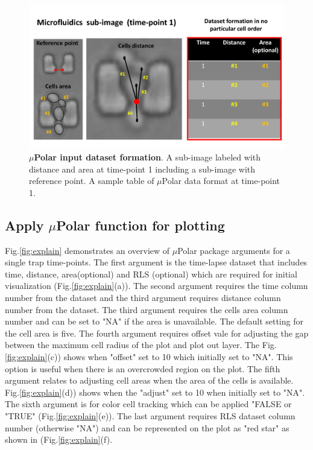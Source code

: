\documentclass[conference]{IEEEtran}
\begin{document}
\begin{figure}
\centering
\includegraphics[width=\textwidth,height=10 cm]{Patterns/table.pdf}
\caption{ \textbf{ $\mu$Polar input dataset formation}. A sub-image labeled with distance and area at time-point 1 including a sub-image with reference point. A sample table of $\mu$Polar data format at time-point 1.}
\label{fig:table}
\end{figure}



\subsection{Apply $\mu$Polar function for plotting}

Fig.\ref{fig:explain} demonstrates an overview of $\mu$Polar package arguments for a single trap time-points. The first argument is the time-lapse dataset that includes time, distance, area(optional) and RLS (optional) which are required for initial visualization (Fig.\ref{fig:explain}(a)). The second argument requires the time column number from the dataset and the third argument requires distance column number from the dataset. The third argument requires the cells area column number and can be set to "NA" if the area is unavailable. The default setting for the cell area is five. The fourth argument requires offset vale for adjusting the gap between the maximum cell radius of the plot and plot out layer. The Fig.\ref{fig:explain}(c)) shows when "offset" set to 10 which initially set to "NA". This option is useful when there is an overcrowded region on the plot. The fifth argument relates to adjusting cell areas when the area of the cells is available. Fig.\ref{fig:explain}(d)) shows when the "adjust" set to 10 when initially set to "NA". The sixth argument is for color cell tracking which can be applied "FALSE or "TRUE" (Fig.\ref{fig:explain}(e)). The last argument requires RLS dataset column number (otherwise "NA") and can be represented on the plot as "red star" as shown in (Fig.\ref{fig:explain}(f).
\end{document}
